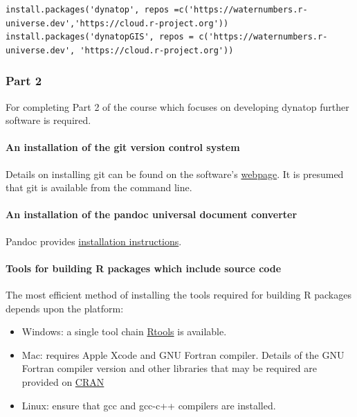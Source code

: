 \documentclass[]{article}
\begin{document}
\begin{verbatim}
install.packages('dynatop', repos =c('https://waternumbers.r-universe.dev','https://cloud.r-project.org'))
install.packages('dynatopGIS', repos = c('https://waternumbers.r-universe.dev', 'https://cloud.r-project.org'))
\end{verbatim}

\subsubsection{Part 2}

For completing Part 2 of the course which focuses on developing
dynatop further software is required.

\paragraph{An installation of the git version control system}

Details on installing git can be found on the software's \href{https://git-scm.com/downloads}{webpage}.
It is presumed that git is available from the command line.

\paragraph{An installation of the pandoc universal document converter}

Pandoc provides \href{https://pandoc.org/installing.html}{installation
instructions}.

\paragraph{Tools for building R packages which include source code}

The most efficient method of installing the tools required for building R
packages depends upon the platform:

\begin{itemize}
\item Windows: a single tool chain
\href{https://cran.r-project.org/bin/windows/Rtools/}{Rtools} is available.

\item Mac: requires Apple Xcode and GNU Fortran compiler. Details of the GNU
Fortran compiler version and other libraries that may be required are
provided on \href{https://mac.r-project.org/tools/}{CRAN}

\item Linux: ensure that gcc and gcc-c++ compilers are installed.

\end{itemize}
\end{document}
